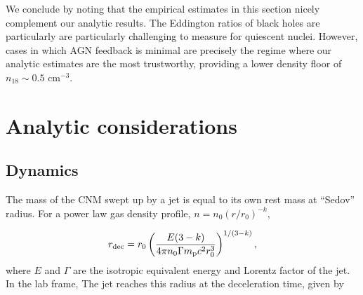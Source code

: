 \documentclass[usenatbib,fleqn]{mnras}
\newcommand\lsim{\mathrel{\rlap{\lower4pt\hbox{\hskip1pt$\sim$}}
    \raise1pt\hbox{$<$}}}
\newcommand\gsim{\mathrel{\rlap{\lower4pt\hbox{\hskip1pt$\sim$}}
    \raise1pt\hbox{$>$}}}
\newcommand{\Mbh}[1][]{M_{\bullet#1}}
\newcommand{\Msun}{{\rm M_\odot}}
\begin{document}


We conclude by noting that the empirical estimates in this section nicely complement our analytic results.  The Eddington ratios of black holes are particularly are particularly challenging to measure for quiescent nuclei.  However, cases in which AGN feedback is minimal are precisely the regime where our analytic estimates are the most trustworthy, providing a lower density floor of $n_{18} \sim 0.5$ cm$^{-3}$.




\section{Analytic considerations}
\label{sec:jet}

\subsection{Dynamics}
\label{sec:analytic}

The mass of the CNM swept up by a jet is equal to its own rest mass at
``Sedov'' radius. For a power law gas density profile, $n= n_0 \left(r/r_0\right)^{-k}$,

\begin{equation}
  r_{\rm dec} = r_0 \left( \frac{E(3-k)}{4\pi n_{0}
      \Gamma m_{\rm p} c^2 r_0^3} \right)^{1/(3-k)}, 
  \label{eq:rdec}
\end{equation}
%
where $E$ and $\Gamma$ are the isotropic equivalent energy and Lorentz
factor of the jet. In the lab frame, The jet reaches this radius
at the deceleration time, given by
\end{document}
